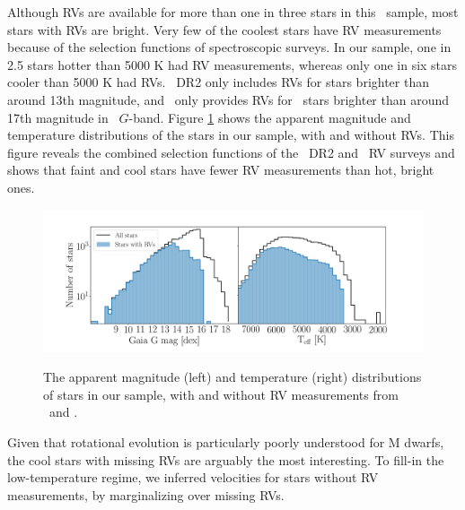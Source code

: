 Although RVs are available for more than one in three stars in this \kepler\
sample, most stars with RVs are bright.
Very few of the coolest stars have RV measurements because of the selection
functions of spectroscopic surveys.
In our sample, one in 2.5 stars hotter than 5000 K had RV measurements,
whereas only one in six stars cooler than 5000 K had RVs.
\gaia\ DR2 only includes RVs for stars brighter than around 13th magnitude,
and \lamost\ only provides RVs for \kepler\ stars brighter than around 17th
magnitude in \gaia\ $G$-band.
Figure \ref{fig:rv_histogram} shows the apparent magnitude and temperature
distributions of the stars in our sample, with and without RVs.
This figure reveals the combined selection functions of the \gaia\ DR2 and
\lamost\ RV surveys and shows that faint and cool stars have fewer RV
measurements than hot, bright ones.
\begin{figure}[ht!]
\caption{
    The apparent magnitude (left) and temperature (right) distributions of
    stars in our sample, with and without RV measurements from \gaia\ and
    \lamost.
}
  \centering \includegraphics[width=1\textwidth]{rv_histogram}
\label{fig:rv_histogram}
\end{figure}
Given that rotational evolution is particularly poorly understood for M
dwarfs, the cool stars with missing RVs are arguably the most interesting.
To fill-in the low-temperature regime, we inferred velocities for stars
without RV measurements, by marginalizing over missing RVs.
